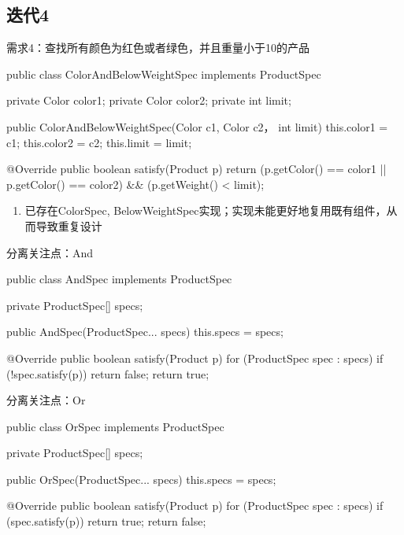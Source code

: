 \subsection{迭代4}

\begin{frame}[fragile]{需求4：查找所有颜色为红色或者绿色，并且重量小于10的产品}
  \begin{java}
public class ColorAndBelowWeightSpec implements ProductSpec {
  private Color color1; private Color color2;
  private int limit;

  public ColorAndBelowWeightSpec(Color c1, Color c2， int limit) {
    this.color1 = c1; this.color2 = c2;
    this.limit = limit;
  }

  @Override
  public boolean satisfy(Product p) {
    return (p.getColor() == color1 || p.getColor() == color2) 
        && (p.getWeight() < limit);
  }
}
  \end{java}

\begin{enumerate}
  \item 已存在ColorSpec, BelowWeightSpec实现；实现未能更好地复用既有组件，从而导致重复设计
\end{enumerate}  
\end{frame}

\begin{frame}[fragile]{分离关注点：And}
  \begin{java}
public class AndSpec implements ProductSpec {
  private ProductSpec[] specs;

  public AndSpec(ProductSpec... specs) {
    this.specs = specs;
  }

  @Override
  public boolean satisfy(Product p) {
    for (ProductSpec spec : specs) {
      if (!spec.satisfy(p))
        return false;
    }
    return true;
  }
}
  \end{java}
\end{frame}

\begin{frame}[fragile]{分离关注点：Or}
  \begin{java}
public class OrSpec implements ProductSpec {
  private ProductSpec[] specs;

  public OrSpec(ProductSpec... specs) {
    this.specs = specs;
  }

  @Override
  public boolean satisfy(Product p) {
    for (ProductSpec spec : specs) {
      if (spec.satisfy(p))
        return true;
    }
    return false;
  }
}
  \end{java}
\end{frame}

